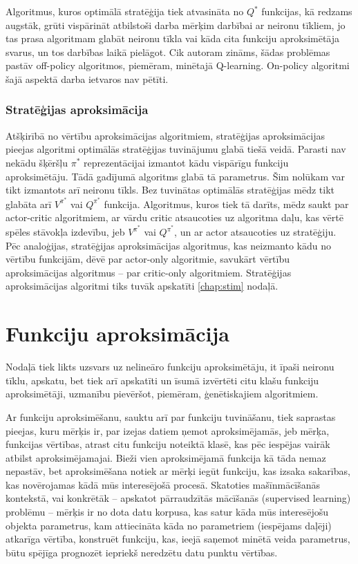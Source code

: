 \documentclass{ludis} %
\begin{document}
Algoritmus, kuros optimālā stratēģija tiek atvasināta no $Q^*$ funkcijas, kā redzams augstāk, grūti vispārināt atbilstoši darba mērķim darbībai ar neironu tīkliem, jo tas prasa algoritmam glabāt neironu tīkla vai kāda cita funkciju aproksimētāja svarus, un tos darbības laikā pielāgot.
Cik autoram zināms, šādas problēmas pastāv off-policy algoritmos, piemēram, minētajā Q-learning.
On-policy algoritmi šajā aspektā darba ietvaros nav pētīti.

\subsection{Stratēģijas aproksimācija}
Atšķirībā no vērtību aproksimācijas algoritmiem, stratēģijas aproksimācijas pieejas algoritmi optimālās stratēģijas tuvinājumu glabā tiešā veidā.
Parasti nav nekādu šķēršļu $\pi^*$ reprezentācijai izmantot kādu vispārīgu funkciju aproksimētāju. Tādā gadījumā algoritms glabā tā parametrus.
Šim nolūkam var tikt izmantots arī neironu tīkls.
Bez tuvinātas optimālās stratēģijas mēdz tikt glabāta arī $V^{\pi^*}$ vai $Q^{\pi^*}$ funkcija.
Algoritmus, kuros tiek tā darīts, mēdz saukt par actor-critic algoritmiem, ar vārdu critic atsaucoties uz algoritma daļu, kas vērtē spēles stāvokļa izdevību, jeb $V^{\pi^*}$ vai $Q^{\pi^*}$, un ar actor atsaucoties uz stratēģiju.
Pēc analoģijas, stratēģijas aproksimācijas algoritmus, kas neizmanto kādu no vērtību funkcijām, dēvē par actor-only algoritmie, savukārt vērtību aproksimācijas algoritmus -- par critic-only algoritmiem.
Stratēģijas aproksimācijas algoritmi tiks tuvāk apskatīti \ref{chap:stim} nodaļā.

\chapter{Funkciju aproksimācija}
Nodaļā tiek likts uzsvars uz nelineāro funkciju aproksimētāju, it īpaši neironu tīklu, apskatu, bet tiek arī apskatīti un īsumā izvērtēti citu klašu funkciju aproksimētāji, uzmanību pievēršot, piemēram, ģenētiskajiem algoritmiem.

Ar funkciju aproksimēšanu, sauktu arī par funkciju tuvināšanu, tiek saprastas pieejas, kuru mērķis ir, par izejas datiem ņemot aproksimējamās, jeb mērķa, funkcijas vērtības, atrast citu funkciju noteiktā klasē, kas pēc iespējas vairāk atbilst aproksimējamajai.
Bieži vien aproksimējamā funkcija kā tāda nemaz nepastāv, bet aproksimēšana notiek ar mērķi iegūt funkciju, kas izsaka sakarības, kas novērojamas kādā mūs interesējošā procesā.
Skatoties mašīnmācīšanās kontekstā, vai konkrētāk -- apskatot pārraudzītās mācīšanās (supervised learning) problēmu -- mērķis ir no dota datu korpusa, kas satur kāda mūs interesējošu objekta parametrus, kam attiecināta kāda no parametriem (iespējams daļēji) atkarīga vērtība, konstruēt funkciju, kas, ieejā saņemot minētā veida parametrus, būtu spējīga prognozēt iepriekš neredzētu datu punktu vērtības.
\end{document}
